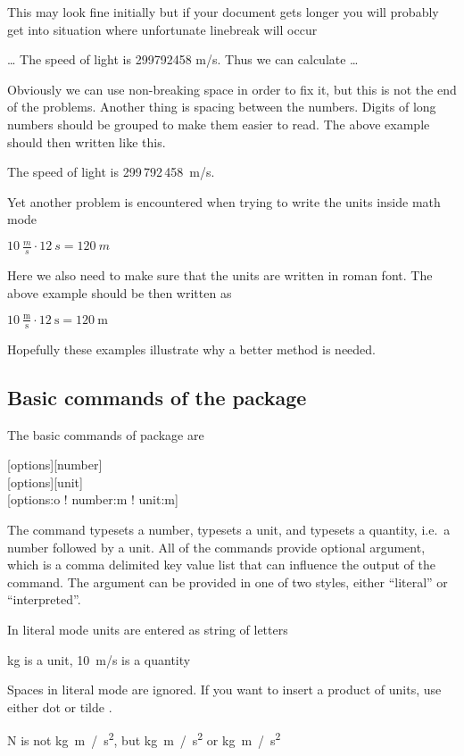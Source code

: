 This may look fine initially but if your document gets longer you will probably
get into situation where unfortunate linebreak will occur 
\begin{example}[examplewidth=6cm]
\ldots{} The speed of light
is 299792458 m/s. Thus we
can calculate \ldots
\end{example}

Obviously we can use non-breaking space in order to fix it, but this is not the
end of the problems. Another thing is spacing between the numbers. Digits of
long numbers should be grouped to make them easier to read. The above example
should then written like this.
\begin{example}[examplewidth=6cm]
The speed of light is
299\,792\,458~m/s.
\end{example}

Yet another problem is encountered when trying to write the units inside math
mode
\begin{example}[examplewidth=6cm]
$10~\frac{m}{s} \cdot 12~s = 120~m$
\end{example}
Here we also need to make sure that the units are written in roman font.
The above example should be then written as
\begin{example}[examplewidth=6cm]
$10~\frac{\mathrm{m}}{\mathrm{s}} 
  \cdot 12~\mathrm{s} 
  = 120~\mathrm{m}$
\end{example}
Hopefully these examples illustrate why a better method is needed.

\subsection{Basic commands of the  package}

The basic commands of  package are
\begin{lscommand}
  [options][number]\\
  [options][unit]\\
  [options:o ! number:m ! unit:m] 
\end{lscommand}
The  command typesets a number,  typesets a unit, and 
typesets a quantity, i.e.\ a number followed by a unit. All of the commands
provide optional  argument, which is a comma delimited key value
list that can influence the output of the command. The  argument can
be provided in one of two styles, either \enquote{literal} or
\enquote{interpreted}.

In literal mode units are entered as string of letters 
\begin{example}
\unit{kg} is a unit,
\qty{10}{m/s} is a quantity
\end{example}
Spaces in literal mode are ignored. If you want to insert a product of units,
use either dot  or tilde \ai{\~}.
\begin{example}
\unit{N} is 
not \unit{kg m / s^2},
but \unit{kg.m / s^2}
or \unit{kg~m / s^2}
\end{example}

